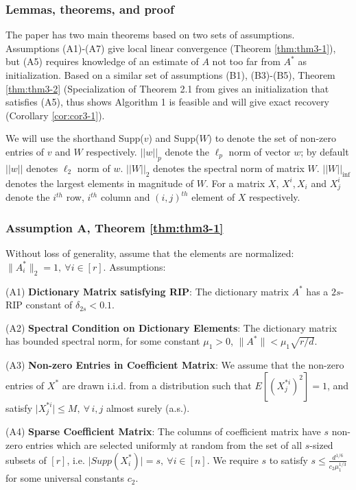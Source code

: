 \subsubsection{Lemmas, theorems, and proof}

The paper has two main theorems based on two sets of assumptions. Assumptions (A1)-(A7) give local linear convergence (Theorem \ref{thm:thm3-1}), but (A5) requires knowledge of an estimate of $A$ not too far from $A^*$ as initialization. Based on a similar set of assumptions (B1), (B3)-(B5), Theorem \ref{thm:thm3-2} (Specialization of Theorem 2.1 from \cite{ref1} gives an initialization that satisfies (A5), thus shows Algorithm 1 is feasible and will give exact recovery (Corollary \ref{cor:cor3-1}).

We will use the shorthand Supp($v$) and Supp($W$) to denote the set of non-zero entries of $v$ and $W$ respectively. $||w||_p$ denote the $\ell_p$ norm of vector $w$; by default $||w||$ denotes $\ell_2$ norm of $w$. $||W||_2$ denotes the spectral norm of matrix $W$. $||W||_{\inf}$ denotes the largest elements in magnitude of $W$. For a matrix $X$, $X^i, X_i$ and $X_j^i$ denote the $i^{th}$ row, $i^{th}$ column and $(i, j)^{th}$ element of $X$ respectively. 

\subsubsection{Assumption A, Theorem \ref{thm:thm3-1}}

Without loss of generality, assume that the elements are normalized: $\lVert A_i^* \rVert_2=1,~\forall i\in[r]$.
Assumptions:

(A1) \textbf{Dictionary Matrix satisfying RIP}: The dictionary matrix $A^*$ has a $2s$-RIP constant of $\delta_{2s}<0.1$.

(A2) \textbf{Spectral Condition on Dictionary Elements}: The dictionary matrix has bounded spectral norm, for some constant $\mu_1>0$, $\lVert A^*\rVert<\mu_1\sqrt{r/d}$.

(A3) \textbf{Non-zero Entries in Coefficient Matrix}: We assume that the non-zero entries of $X^*$ are drawn i.i.d. from a distribution such that $E[(X^{*i}_j)^2]=1$, and satisfy $\lvert X^{*i}_j\rvert \leq M,~\forall\, i,j$ almost surely (a.s.).

(A4) \textbf{Sparse Coefficient Matrix}: The columns of coefficient matrix have $s$ non-zero entries which are selected uniformly at random from the set of all $s$-sized subsets of $[r]$, i.e. $\lvert Supp(X^{*}_i)\rvert=s,~\forall i\in [n]$. We require $s$ to satisfy $s\leq \frac{d^{1/6}}{c_2\mu_1^{1/3}}$ for some universal constants $c_2$.

